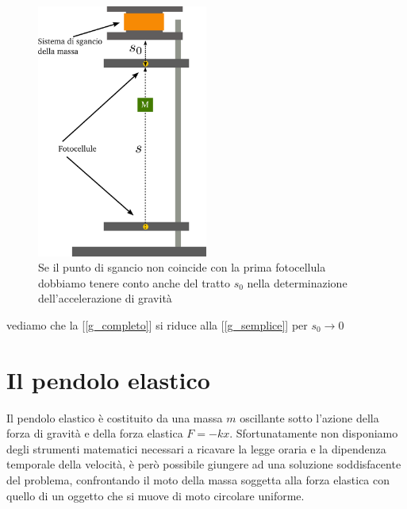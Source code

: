 \documentclass[a4paper,10pt,oneside]{article}
\begin{document}
\begin{figure}[H]
 \centering
 \includegraphics[width=0.5\textwidth]{./Immagini/gravita_2.png}
 \caption{Se il punto di sgancio non coincide con la prima fotocellula dobbiamo tenere conto anche del tratto $s_0$ nella determinazione dell'accelerazione di gravità}
 \label{fig:gravita_2}
\end{figure}

vediamo che la [\ref{g_completo}] si riduce alla [\ref{g_semplice}] per $s_0\to 0$


\section*{Il pendolo elastico}

Il pendolo elastico è costituito da una massa $m$ oscillante sotto l'azione della forza di gravità e  della forza elastica $F=-kx$. Sfortunatamente non disponiamo degli strumenti matematici necessari a ricavare la legge oraria e la dipendenza temporale della velocità, è però possibile giungere ad una soluzione soddisfacente del problema, confrontando il moto della massa soggetta alla forza elastica con quello di un oggetto che si muove di moto circolare uniforme.
\end{document}
